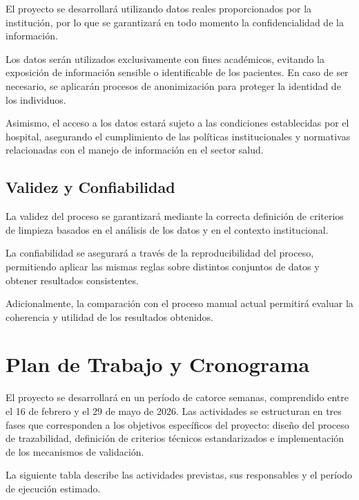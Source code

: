 \documentclass[12pt, letterpaper, oneside]{article}
\begin{document}
El proyecto se desarrollará utilizando datos reales proporcionados por la institución, por lo que se garantizará en todo momento la confidencialidad de la información.

Los datos serán utilizados exclusivamente con fines académicos, evitando la exposición de información sensible o identificable de los pacientes. En caso de ser necesario, se aplicarán procesos de anonimización para proteger la identidad de los individuos.

Asimismo, el acceso a los datos estará sujeto a las condiciones establecidas por el hospital, asegurando el cumplimiento de las políticas institucionales y normativas relacionadas con el manejo de información en el sector salud.

\subsection{Validez y Confiabilidad}

La validez del proceso se garantizará mediante la correcta definición de criterios de limpieza basados en el análisis de los datos y en el contexto institucional.

La confiabilidad se asegurará a través de la reproducibilidad del proceso, permitiendo aplicar las mismas reglas sobre distintos conjuntos de datos y obtener resultados consistentes.

Adicionalmente, la comparación con el proceso manual actual permitirá evaluar la coherencia y utilidad de los resultados obtenidos.

\newpage


\section{Plan de Trabajo y Cronograma}

El proyecto se desarrollará en un período de catorce semanas, comprendido entre el 16 de febrero y el 29 de mayo de 2026. Las actividades se estructuran en tres fases que corresponden a los objetivos específicos del proyecto: diseño del proceso de trazabilidad, definición de criterios técnicos estandarizados e implementación de los mecanismos de validación.

La siguiente tabla describe las actividades previstas, sus responsables y el período de ejecución estimado.
\end{document}
